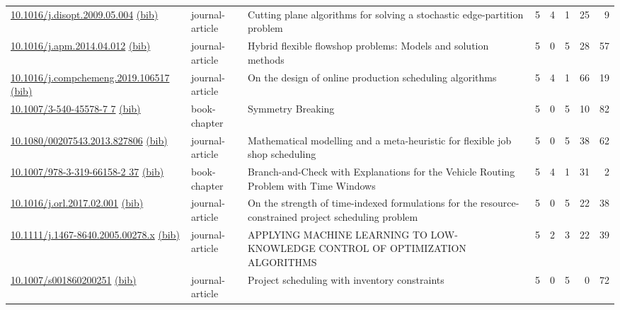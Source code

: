 {\begin{longtable}{p{5cm}lp{11cm}rrrrr}
\href{http://dx.doi.org/10.1016/j.disopt.2009.05.004}{10.1016/j.disopt.2009.05.004} \href{https://www.doi2bib.org/bib/10.1016/j.disopt.2009.05.004}{(bib)} & journal-article & Cutting plane algorithms for solving a stochastic edge-partition problem & 5 & 4 & 1 & 25 & 9 \\
\href{http://dx.doi.org/10.1016/j.apm.2014.04.012}{10.1016/j.apm.2014.04.012} \href{https://www.doi2bib.org/bib/10.1016/j.apm.2014.04.012}{(bib)} & journal-article & Hybrid flexible flowshop problems: Models and solution methods & 5 & 0 & 5 & 28 & 57 \\
\href{http://dx.doi.org/10.1016/j.compchemeng.2019.106517}{10.1016/j.compchemeng.2019.106517} \href{https://www.doi2bib.org/bib/10.1016/j.compchemeng.2019.106517}{(bib)} & journal-article & On the design of online production scheduling algorithms & 5 & 4 & 1 & 66 & 19 \\
\href{http://dx.doi.org/10.1007/3-540-45578-7_7}{10.1007/3-540-45578-7 7} \href{https://www.doi2bib.org/bib/10.1007/3-540-45578-7_7}{(bib)} & book-chapter & Symmetry Breaking & 5 & 0 & 5 & 10 & 82 \\
\href{http://dx.doi.org/10.1080/00207543.2013.827806}{10.1080/00207543.2013.827806} \href{https://www.doi2bib.org/bib/10.1080/00207543.2013.827806}{(bib)} & journal-article & Mathematical modelling and a meta-heuristic for flexible job shop scheduling & 5 & 0 & 5 & 38 & 62 \\
\href{http://dx.doi.org/10.1007/978-3-319-66158-2_37}{10.1007/978-3-319-66158-2 37} \href{https://www.doi2bib.org/bib/10.1007/978-3-319-66158-2_37}{(bib)} & book-chapter & Branch-and-Check with Explanations for the Vehicle Routing Problem with Time Windows & 5 & 4 & 1 & 31 & 2 \\
\href{http://dx.doi.org/10.1016/j.orl.2017.02.001}{10.1016/j.orl.2017.02.001} \href{https://www.doi2bib.org/bib/10.1016/j.orl.2017.02.001}{(bib)} & journal-article & On the strength of time-indexed formulations for the resource-constrained project scheduling problem & 5 & 0 & 5 & 22 & 38 \\
\href{http://dx.doi.org/10.1111/j.1467-8640.2005.00278.x}{10.1111/j.1467-8640.2005.00278.x} \href{https://www.doi2bib.org/bib/10.1111/j.1467-8640.2005.00278.x}{(bib)} & journal-article & APPLYING MACHINE LEARNING TO LOW-KNOWLEDGE CONTROL OF OPTIMIZATION ALGORITHMS & 5 & 2 & 3 & 22 & 39 \\
\href{http://dx.doi.org/10.1007/s001860200251}{10.1007/s001860200251} \href{https://www.doi2bib.org/bib/10.1007/s001860200251}{(bib)} & journal-article & Project scheduling with inventory constraints & 5 & 0 & 5 & 0 & 72 \\

\end{longtable}}
